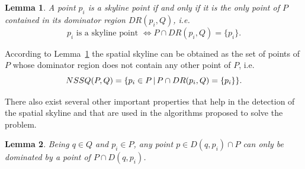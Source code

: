 \documentclass[11pt,onecolumn]{elsart3p}
\newtheorem{lemma}{Lemma}
\newcommand{\todecide}{\textcolor{Orchid}}
\begin{document}
        \begin{lemma} A point $p_i$ is a skyline point if and only if it is the only point of $P$ contained in its dominator region $DR(p_i,Q)$, i.e. $$ p_i \text{ is a skyline point } \iff P \cap DR(p_i,Q)= \{p_i \}.$$ %
        \label{lemma:SkylinePoints2}
        \end{lemma}

        According to Lemma~\ref{lemma:SkylinePoints2} the spatial skyline can be obtained as the set of points of $P$ whose dominator region does not contain any other point of $P$, i.e. $$ NSSQ(P,Q) = \{ p_i \in P \, | \, P \cap DR(p_i,Q)  = \{p_i \} \}.\vspace{0.6em}$$




        There also exist several other important properties that help in the detection of the spatial skyline and that are used in the algorithms proposed to solve the problem.\vspace{0.6em}


        \begin{lemma} Being $q\in Q$ and $p_i\in P$, any point $p\in D(q,p_i) \cap P$ can only be dominated by a point of $P \cap D(q,p_i)$.
        \label{lemma:indep_regions} \end{lemma} \vspace{0.6cm}
\end{document}
